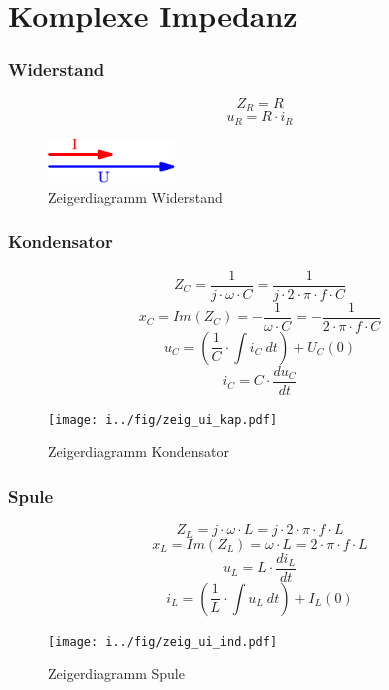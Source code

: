 



\section{Komplexe Impedanz}

\subsubsection{Widerstand}
\[ Z_R = R \]
\[ u_R = R \cdot i_R \]
\begin{figure}[h!]
	\centering
	\includegraphics[width=0.3\textwidth]{../fig/zeig_ui_wid.pdf}
	\caption{Zeigerdiagramm Widerstand}
	\label{fig:zeig_ui_wid}
\end{figure}

\newpage
\subsubsection{Kondensator}
\[ Z_C = \frac{1}{j \cdot \omega \cdot C} 
= \frac{1}{j \cdot 2 \cdot \pi \cdot f \cdot C} \]
\[ x_C = Im(Z_C) = -\frac{1}{\omega \cdot C} 
= -\frac{1}{2 \cdot \pi \cdot f \cdot C} \]
\[ u_C = \left( \frac{1}{C} \cdot \int i_C ~ dt \right) + U_C(0) \]
\[ i_C = C \cdot \frac{du_C}{dt} \]
\begin{figure}[h!]
	\centering
	\texttt{[image: i../fig/zeig\_ui\_kap.pdf]}
	\caption{Zeigerdiagramm Kondensator}
	\label{fig:zeig_ui_kap}
\end{figure}

\subsubsection{Spule}
\[ Z_L = j \cdot \omega \cdot L = j \cdot 2 \cdot \pi \cdot f \cdot L \]
\[ x_L = Im(Z_L) = \omega \cdot L = 2 \cdot \pi \cdot f \cdot L \]
\[ u_L = L \cdot \frac{di_L}{dt} \]
\[ i_L = \left( \frac{1}{L} \cdot \int u_L ~ dt \right) + I_L(0) \]
\begin{figure}[h!]
	\centering
	\texttt{[image: i../fig/zeig\_ui\_ind.pdf]}
	\caption{Zeigerdiagramm Spule}
	\label{fig:zeig_ui_ind}
\end{figure}
